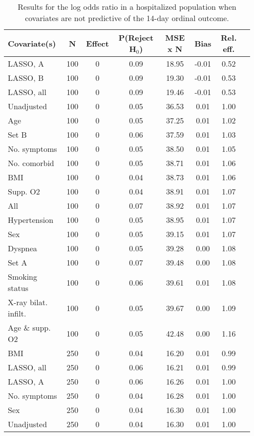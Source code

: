 \documentclass{article}
\begin{document}
{\tabcolsep=6pt  %
\begin{longtable}{lccccccc}
\caption{Results for the log odds ratio in a hospitalized population when covariates are not predictive of the 14-day ordinal outcome.}\label{tab19}\\
Covariate(s) & N & Effect & P(Reject H$_0$) & MSE x N & Bias & Rel. eff.\\ \midrule
LASSO, A & 100 & 0 & 0.09 & 18.95 & -0.01 & 0.52\\
LASSO, B & 100 & 0 & 0.09 & 19.30 & -0.01 & 0.53\\
LASSO, all & 100 & 0 & 0.09 & 19.46 & -0.01 & 0.53\\
Unadjusted & 100 & 0 & 0.05 & 36.53 & 0.01 & 1.00\\
Age & 100 & 0 & 0.05 & 37.25 & 0.01 & 1.02\\
Set B & 100 & 0 & 0.06 & 37.59 & 0.01 & 1.03\\
No. symptoms & 100 & 0 & 0.05 & 38.50 & 0.01 & 1.05\\
No. comorbid & 100 & 0 & 0.05 & 38.71 & 0.01 & 1.06\\
BMI & 100 & 0 & 0.04 & 38.73 & 0.01 & 1.06\\
Supp. O2 & 100 & 0 & 0.04 & 38.91 & 0.01 & 1.07\\
All & 100 & 0 & 0.07 & 38.92 & 0.01 & 1.07\\
Hypertension & 100 & 0 & 0.05 & 38.95 & 0.01 & 1.07\\
Sex & 100 & 0 & 0.05 & 39.15 & 0.01 & 1.07\\
Dyspnea & 100 & 0 & 0.05 & 39.28 & 0.00 & 1.08\\
Set A & 100 & 0 & 0.07 & 39.48 & 0.00 & 1.08\\
Smoking status & 100 & 0 & 0.06 & 39.61 & 0.01 & 1.08\\
X-ray bilat. infilt. & 100 & 0 & 0.05 & 39.67 & 0.00 & 1.09\\
Age \& supp. O2 & 100 & 0 & 0.05 & 42.48 & 0.00 & 1.16\\ \midrule
BMI & 250 & 0 & 0.04 & 16.20 & 0.01 & 0.99\\
LASSO, all & 250 & 0 & 0.06 & 16.21 & 0.01 & 0.99\\
LASSO, A & 250 & 0 & 0.06 & 16.26 & 0.01 & 1.00\\
No. symptoms & 250 & 0 & 0.04 & 16.28 & 0.01 & 1.00\\
Sex & 250 & 0 & 0.04 & 16.30 & 0.01 & 1.00\\
Unadjusted & 250 & 0 & 0.04 & 16.30 & 0.01 & 1.00\\

\end{longtable}}
\end{document}
